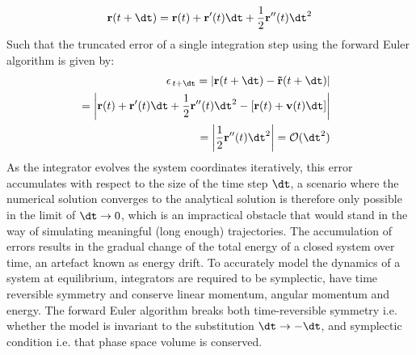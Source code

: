 \begin{equation}
    \mathbf{r}(t+\dt) = \mathbf{r}(t) + \mathbf{r'}(t)\dt + \frac{1}{2}\mathbf{r''}(t)\dt^2 %
\end{equation}
Such that the truncated error of a single integration step using the forward Euler algorithm is given by:
\begin{subequations} \label{eq:euler_error}
\begin{align}
\begin{split}
    \epsilon_{\,t+\dt} &= \left|\mathbf{r}(t+\dt) - \mathbf{\tilde{r}}(t+\dt)\right|
\end{split}\\
\begin{split}
    &=  \left|\mathbf{r}(t) + \mathbf{r'}(t)\dt + \frac{1}{2}\mathbf{r''}(t)\dt^2 - \left[   \mathbf{r}(t) + \mathbf{v}(t)\dt   \right]\right|
\end{split}\\
\begin{split}
    &= \left| \frac{1}{2} \mathbf{r''}(t)\dt^2 \right| = \mathcal{O}(\dt^2)
\end{split}
\end{align}
\end{subequations}
\vspace{-0.1cm}
As the integrator evolves the system coordinates iteratively, this error accumulates with respect to the size of the time step $\dt$, a scenario where the numerical solution converges to the analytical solution is therefore only possible in the limit of $\dt \rightarrow 0$, which is an impractical obstacle that would stand in the way of simulating meaningful (long enough) trajectories. The accumulation of errors results in the gradual change of the total energy of a closed system over time, an artefact known as energy drift. To accurately model the dynamics of a system at equilibrium, integrators are required to be symplectic, have time reversible symmetry and conserve linear momentum, angular momentum and energy. The forward Euler algorithm breaks both time-reversible symmetry i.e. whether the model is invariant to the substitution $\dt \rightarrow -\dt$, and symplectic condition i.e. that phase space volume is conserved. 

